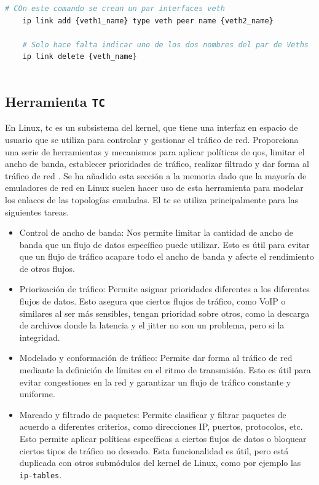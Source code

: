\begin{lstlisting}[language= bash, style=Consola, caption={Uso de las interfaces Veths},label=code:iproute2_veth]
    # COn este comando se crean un par interfaces veth
    ip link add {veth1_name} type veth peer name {veth2_name}
    
    # Solo hace falta indicar uno de los dos nombres del par de Veths
    ip link delete {veth_name}
    
\end{lstlisting}
\vspace{0.5cm}



\subsection{Herramienta \texttt{TC}}


En Linux, \gls{tc} es un subsistema del kernel, que tiene una interfaz en espacio de usuario que se utiliza para controlar y gestionar el tráfico de red. Proporciona una serie de herramientas y mecanismos para aplicar políticas de \gls{qos}, limitar el ancho de banda, establecer prioridades de tráfico, realizar filtrado y dar forma al tráfico de red \cite{tc1}. Se ha añadido esta sección a la memoria dado que la mayoría de emuladores de red en Linux suelen hacer uso de esta herramienta para modelar los enlaces de las topologías emuladas. El \gls{tc}  se utiliza principalmente para las siguientes tareas.

\begin{itemize}
    \item Control de ancho de banda: Nos permite limitar la cantidad de ancho de banda que un flujo de datos específico puede utilizar. Esto es útil para evitar que un flujo de tráfico acapare todo el ancho de banda y afecte el rendimiento de otros flujos.

    \item Priorización de tráfico: Permite asignar prioridades diferentes a los diferentes flujos de datos. Esto asegura que ciertos flujos de tráfico, como VoIP o similares al ser más sensibles, tengan prioridad sobre otros, como la descarga de archivos donde la latencia y el jitter no son un problema, pero si la integridad.

    \item Modelado y conformación de tráfico: Permite dar forma al tráfico de red mediante la definición de límites en el ritmo de transmisión. Esto es útil para evitar congestiones en la red y garantizar un flujo de tráfico constante y uniforme.

    \item Marcado y filtrado de paquetes: Permite clasificar y filtrar paquetes de acuerdo a diferentes criterios, como direcciones IP, puertos, protocolos, etc. Esto permite aplicar políticas específicas a ciertos flujos de datos o bloquear ciertos tipos de tráfico no deseado. Esta funcionalidad es útil, pero está duplicada con otros submódulos del kernel de Linux, como por ejemplo las \texttt{ip-tables}.
\end{itemize}

